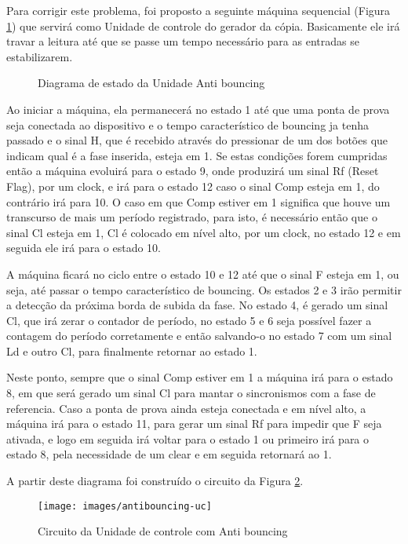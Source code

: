 \documentclass[12pt,a4paper,openany]{abntex2}
\begin{document}
Para corrigir este problema, foi proposto a seguinte máquina sequencial (Figura \ref{fig:antibouncing-diagrama}) que servirá como Unidade de controle do gerador da cópia. Basicamente ele irá travar a leitura até que se passe um tempo necessário para as entradas se estabilizarem.

\begin{figure}[!htp]
	\centering
	\caption{Diagrama de estado da Unidade Anti bouncing}
	\label{fig:antibouncing-diagrama}
\end{figure}

Ao iniciar a máquina, ela permanecerá no estado 1 até que uma ponta de prova seja conectada ao dispositivo e o tempo característico de bouncing ja tenha passado e o sinal H, que é recebido através do pressionar de um dos botões que indicam qual é a fase inserida, esteja em 1. Se estas condições forem cumpridas então a máquina evoluirá para o estado 9, onde produzirá um sinal Rf (Reset Flag), por um clock, e irá para o estado 12 caso o sinal Comp esteja em 1, do contrário irá para 10. O caso em que Comp estiver em 1 significa que houve um transcurso de mais um período registrado, para isto, é necessário então que o sinal Cl esteja em 1, Cl é colocado em nível alto, por um clock, no estado 12 e em seguida ele irá para o estado 10.

A máquina ficará no ciclo entre o estado 10 e 12 até que o sinal F esteja em 1, ou seja, até passar o tempo característico de bouncing. Os estados 2 e 3 irão permitir a detecção da próxima borda de subida da fase. No estado 4, é gerado um sinal Cl, que irá zerar o contador de período, no estado 5 e 6 seja possível fazer a contagem do período corretamente e então salvando-o no estado 7 com um sinal Ld e outro Cl, para finalmente retornar ao estado 1.

Neste ponto, sempre que o sinal Comp estiver em 1 a máquina irá para o estado 8, em que será gerado um sinal Cl para mantar o sincronismos com a fase de referencia. Caso a ponta de prova ainda esteja conectada e em nível alto, a máquina irá para o estado 11, para gerar um sinal Rf para impedir que F seja ativada, e logo em seguida irá voltar para o estado 1 ou primeiro irá para o estado 8, pela necessidade de um clear e em seguida retornará ao 1.

A partir deste diagrama foi construído o circuito da Figura \ref{fig:antibouncing-uc}.

\begin{figure}[!htp]
	\centering
	\caption{Circuito da Unidade de controle com Anti bouncing}
	\texttt{[image: images/antibouncing-uc]}	\label{fig:antibouncing-uc}
\end{figure}
\end{document}
